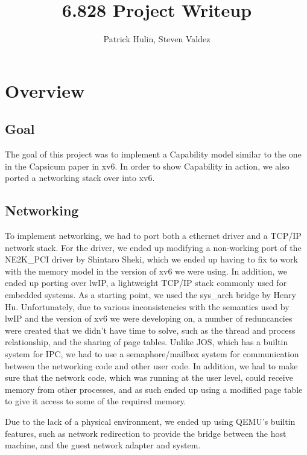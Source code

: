 \documentclass[11pt]{article}
\title{6.828 Project Writeup}
\author{Patrick Hulin, Steven Valdez}
\begin{document}
\maketitle

\section{Overview}

\subsection{Goal}
The goal of this project was to implement a Capability model similar to the one in the Capsicum paper in xv6. In order to show Capability in action, we also ported a networking stack over into xv6.

\subsection{Networking}
To implement networking, we had to port both a ethernet driver and a TCP/IP network stack. For the driver, we ended up modifying a non-working port of the NE2K\_PCI driver by Shintaro Sheki, which we ended up having to fix to work with the memory model in the version of xv6 we were using. In addition, we ended up porting over lwIP, a lightweight TCP/IP stack commonly used for embedded systems. As a starting point, we used the sys\_arch bridge by Henry Hu. Unfortunately, due to various inconsistencies with the semantics used by lwIP and the version of xv6 we were developing on, a number of reduncancies were created that we didn't have time to solve, such as the thread and process relationship, and the sharing of page tables. Unlike JOS, which has a builtin system for IPC, we had to use a semaphore/mailbox system for communication between the networking code and other user code. In addition, we had to make sure that the network code, which was running at the user level, could receive memory from other processes, and as such ended up using a modified page table to give it access to some of the required memory.

Due to the lack of a physical environment, we ended up using QEMU's builtin features, such as network redirection to provide the bridge between the host machine, and the guest network adapter and system. 
\end{document}
